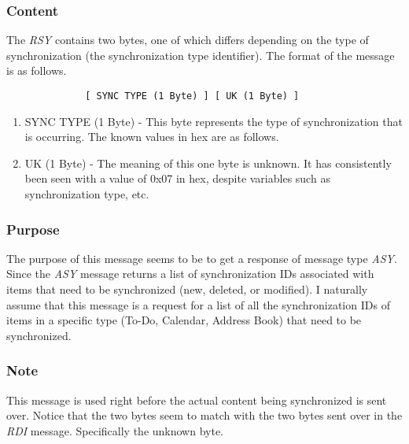             \subsubsection{Content}

            The \emph{RSY} contains two bytes, one of which differs depending
            on the type of synchronization (the synchronization type
            identifier). The format of the message is as follows.

            \begin{verbatim}
              [ SYNC TYPE (1 Byte) ] [ UK (1 Byte) ]
            \end{verbatim}

            \begin{enumerate}
            \item SYNC TYPE (1 Byte) - This byte represents the type of
              synchronization that is occurring. The known values in hex are
              as follows.

              \synctypes

            \item UK (1 Byte) - The meaning of this one byte is unknown. It
              has consistently been seen with a value of 0x07 in hex, despite
              variables such as synchronization type, etc.
            \end{enumerate}
            
            \subsubsection{Purpose}

            The purpose of this message seems to be to get a response of
            message type \emph{ASY}. Since the \emph{ASY} message returns a
            list of synchronization IDs associated with items that need to be
            synchronized (new, deleted, or modified). I naturally assume that
            this message is a request for a list of all the synchronization
            IDs of items in a specific type (To-Do, Calendar, Address Book)
            that need to be synchronized.

            \subsubsection{Note}

            This message is used right before the actual content being
            synchronized is sent over. Notice that the two bytes seem to match
            with the two bytes sent over in the \emph{RDI}
            message. Specifically the unknown byte.

